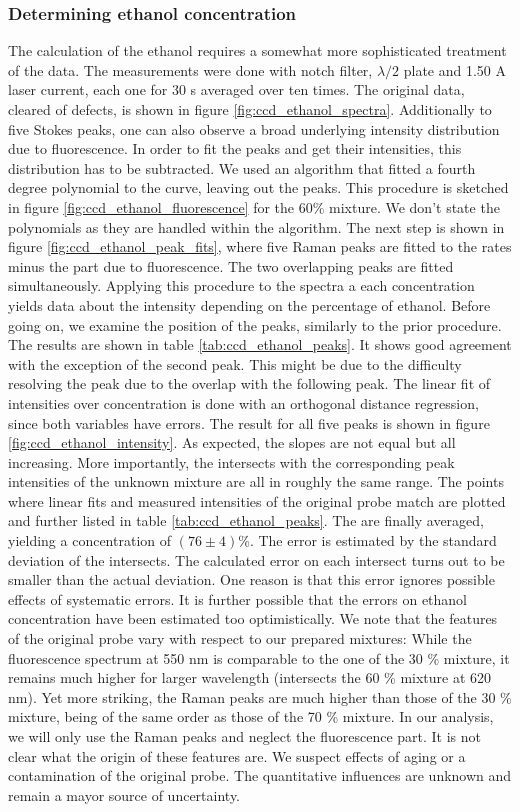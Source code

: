 \subsubsection{Determining ethanol concentration}
The calculation of the ethanol requires a somewhat more sophisticated treatment of the data. 
The measurements were done with notch filter, $\lambda / 2$ plate and 1.50 A laser current, 
each one for 30 s averaged over ten times. The original data, cleared of defects, is shown 
in figure \ref{fig:ccd_ethanol_spectra}. Additionally to five Stokes peaks, one can also observe 
a broad underlying intensity distribution due to fluorescence. In order to fit the peaks and get 
their intensities, this distribution has to be subtracted. We used an algorithm that fitted a 
fourth degree polynomial to the curve, leaving out the peaks. This procedure is sketched in 
figure \ref{fig:ccd_ethanol_fluorescence} for the 60\% mixture. We don't state the polynomials as they 
are handled within the algorithm. 
The next step is shown in figure \ref{fig:ccd_ethanol_peak_fits}, where five Raman 
peaks are fitted to the rates minus the part due to fluorescence. The two overlapping peaks are fitted
simultaneously. Applying this procedure to 
the spectra a each concentration yields data about the intensity depending on the percentage of ethanol. 
Before going on, we examine the position of the peaks, similarly to the prior procedure. 
The results are shown in table \ref{tab:ccd_ethanol_peaks}. It shows good agreement with the exception 
of the second peak. This might be due to the difficulty resolving the peak due to the overlap with the 
following peak.
The linear fit of intensities over concentration is done with an orthogonal distance regression, 
since both variables have errors. The result for all five peaks is shown in figure 
\ref{fig:ccd_ethanol_intensity}. As expected, the slopes are not equal but all increasing. 
More importantly, the intersects with the corresponding peak intensities of the unknown mixture 
are all in roughly the same range. The points where linear fits and measured intensities of the original 
probe match are plotted and further listed in table \ref{tab:ccd_ethanol_peaks}. The are finally 
averaged, yielding a concentration of $(76 \pm 4)$\%. The error is estimated by the standard deviation of 
the intersects. The calculated error on each intersect turns out to be smaller than the actual deviation.
One reason is that this error ignores possible effects of systematic errors. It is further possible that 
the errors on ethanol concentration have been estimated too optimistically.
We note that the features of the original 
probe vary with respect to our prepared mixtures: While the fluorescence spectrum at 550 nm is comparable 
to the one of the 30 \% mixture, it remains much higher for larger wavelength (intersects the 60 \% mixture 
at 620 nm). Yet more striking, the Raman peaks are much higher than those of the 30 \% mixture, being of the 
same order as those of the 70 \% mixture. In our analysis, we will only use the Raman peaks and neglect the 
fluorescence part. It is not clear what the origin of these features are. We suspect effects of aging or a
contamination of the original probe. The quantitative influences are unknown and remain a mayor source of 
uncertainty. 
 

